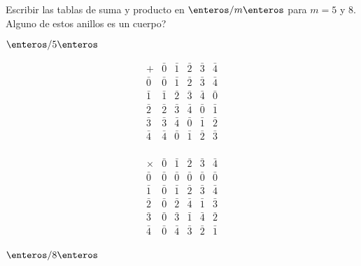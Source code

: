 \begin{enunciado}{\ejercicio}
Escribir las tablas de suma y producto en $\enteros/m\enteros$ para $m=5$ y $8$. Alguno de estos anillos es un cuerpo?
\end{enunciado}


\begin{center}
\textbf{$\enteros/5\enteros$}
\end{center}


\vspace{0.3cm}

\noindent
\begin{minipage}{0.48\textwidth}
\[
\begin{array}{c|ccccc}
+ & \bar{0} & \bar{1} & \bar{2} & \bar{3} & \bar{4} \\
\hline
\bar{0} & \bar{0} & \bar{1} & \bar{2} & \bar{3} & \bar{4} \\
\bar{1} & \bar{1} & \bar{2} & \bar{3} & \bar{4} & \bar{0} \\
\bar{2} & \bar{2} & \bar{3} & \bar{4} & \bar{0} & \bar{1} \\
\bar{3} & \bar{3} & \bar{4} & \bar{0} & \bar{1} & \bar{2} \\
\bar{4} & \bar{4} & \bar{0} & \bar{1} & \bar{2} & \bar{3} \\
\end{array}
\]
\end{minipage}%
\hfill
\begin{minipage}{0.48\textwidth}
\[
\begin{array}{c|ccccc}
\times & \bar{0} & \bar{1} & \bar{2} & \bar{3} & \bar{4} \\
\hline
\bar{0} & \bar{0} & \bar{0} & \bar{0} & \bar{0} & \bar{0} \\
\bar{1} & \bar{0} & \bar{1} & \bar{2} & \bar{3} & \bar{4} \\
\bar{2} & \bar{0} & \bar{2} & \bar{4} & \bar{1} & \bar{3} \\
\bar{3} & \bar{0} & \bar{3} & \bar{1} & \bar{4} & \bar{2} \\
\bar{4} & \bar{0} & \bar{4} & \bar{3} & \bar{2} & \bar{1} \\
\end{array}
\]
\end{minipage}

\vspace{1cm}

\begin{center}
\textbf{$\enteros/8\enteros$}
\end{center}

